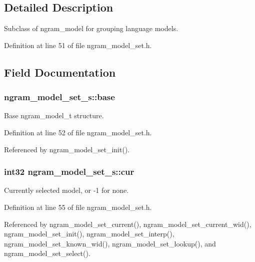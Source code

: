 \subsection{Detailed Description}
Subclass of ngram\+\_\+model for grouping language models. 

Definition at line 51 of file ngram\+\_\+model\+\_\+set.\+h.



\subsection{Field Documentation}
\subsubsection[{base}]{ ngram\+\_\+model\+\_\+set\+\_\+s\+::base}\label{structngram__model__set__s_a3b88f17aa148ceac4f32dd4cbf5f4f81}


Base ngram\+\_\+model\+\_\+t structure. 



Definition at line 52 of file ngram\+\_\+model\+\_\+set.\+h.



Referenced by ngram\+\_\+model\+\_\+set\+\_\+init().

\subsubsection[{cur}]{\setlength{\rightskip}{0pt plus 5cm}int32 ngram\+\_\+model\+\_\+set\+\_\+s\+::cur}\label{structngram__model__set__s_a031e7d7dcf1667f69e1cb980f45623cb}


Currently selected model, or -\/1 for none. 



Definition at line 55 of file ngram\+\_\+model\+\_\+set.\+h.



Referenced by ngram\+\_\+model\+\_\+set\+\_\+current(), ngram\+\_\+model\+\_\+set\+\_\+current\+\_\+wid(), ngram\+\_\+model\+\_\+set\+\_\+init(), ngram\+\_\+model\+\_\+set\+\_\+interp(), ngram\+\_\+model\+\_\+set\+\_\+known\+\_\+wid(), ngram\+\_\+model\+\_\+set\+\_\+lookup(), and ngram\+\_\+model\+\_\+set\+\_\+select().


